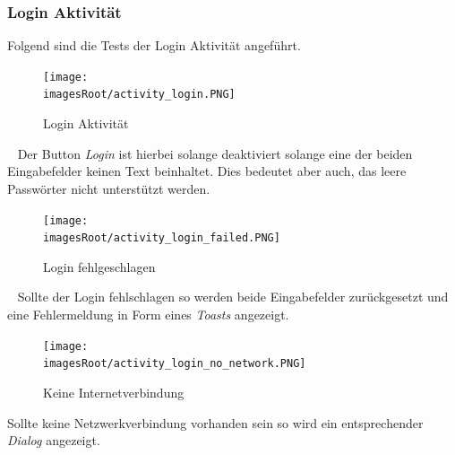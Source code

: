 \documentclass[11pt, a4paper, twoside]{article}   	%
\newcommand{\imagesRoot}{images}
\begin{document}
\subsubsection{Login Aktivität}
Folgend sind die Tests der Login Aktivität angeführt.
\begin{figure}[h]
	\centering
	\texttt{[image: \\imagesRoot/activity\_login.PNG]}
	\caption
	{Login Aktivität}
\end{figure}
\ \newline
Der Button \emph{Login} ist hierbei solange deaktiviert solange eine der beiden Eingabefelder keinen Text beinhaltet. Dies bedeutet aber auch, das leere Passwörter nicht unterstützt werden.
\begin{figure}[h]
	\centering
	\texttt{[image: \\imagesRoot/activity\_login\_failed.PNG]}
	\caption
	{Login fehlgeschlagen}
\end{figure}
\ \newline
Sollte der Login fehlschlagen so werden beide Eingabefelder zurückgesetzt und eine Fehlermeldung in Form eines \emph{Toasts} angezeigt.
\newpage
\begin{figure}[h]
	\centering
	\texttt{[image: \\imagesRoot/activity\_login\_no\_network.PNG]}
	\caption
	{Keine Internetverbindung}
\end{figure}
Sollte keine Netzwerkverbindung vorhanden sein so wird ein entsprechender \emph{Dialog} angezeigt.
\newline
\end{document}

